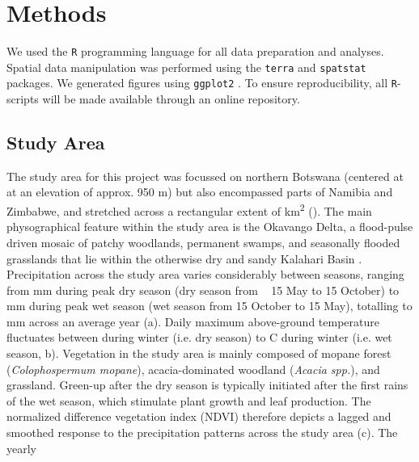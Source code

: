 \documentclass[abstract=on,10pt,a4paper,bibliography=totocnumbered]{article}
\newcommand{\inputy}[1]{\unskip}
\begin{document}
\section{Methods}
We used the \texttt{R} programming language \citep{RCoreTeam.2022} for all data
preparation and analyses. Spatial data manipulation was performed using the
\texttt{terra} \citep{Hijmans.2023} and \texttt{spatstat} \citep{Baddeley.2015}
packages. We generated figures using \texttt{ggplot2} \citep{Wickham.2016}. To
ensure reproducibility, all \texttt{R}-scripts will be made available through an
online repository.

\subsection{Study Area}
The study area for this project was focussed on northern Botswana (centered at
\inputy{99_GeneralMetrics/StudyAreaCenter.tex} at an elevation of approx. 950 m)
but also encompassed parts of Namibia and Zimbabwe, and stretched across a
rectangular extent of \inputy{99_GeneralMetrics/SizeStudyArea.tex}
km\textsuperscript{2} (). The main physographical feature within
the study area is the Okavango Delta, a flood-pulse driven mosaic of patchy
woodlands, permanent swamps, and seasonally flooded grasslands that lie within
the otherwise dry and sandy Kalahari Basin \citep{Wilson.1976, Ramberg.2006}.
Precipitation across the study area varies considerably between seasons, ranging
from \inputy{99_GeneralMetrics/MinimumPrecipitation.tex} mm during peak dry
season (dry season from ~ 15 May to 15 October) to
\inputy{99_GeneralMetrics/MaximumPrecipitation.tex} mm during peak wet season
(wet season from 15 October to 15 May), totalling to
\inputy{99_GeneralMetrics/TotalPrecipitation.tex} mm across an average year
(a). Daily maximum above-ground temperature fluctuates between
\inputy{99_GeneralMetrics/MinimumTemperature.tex} during winter (i.e. dry
season) to \inputy{99_GeneralMetrics/MaximumTemperature.tex}\degree C during
winter (i.e. wet season, b). Vegetation in the study area is
mainly composed of mopane forest (\textit{Colophospermum mopane}),
acacia-dominated woodland (\textit{Acacia spp.}), and grassland. Green-up after
the dry season is typically initiated after the first rains of the wet season,
which stimulate plant growth and leaf production. The normalized difference
vegetation index (NDVI) therefore depicts a lagged and smoothed response to the
precipitation patterns across the study area (c). The yearly
\end{document}
